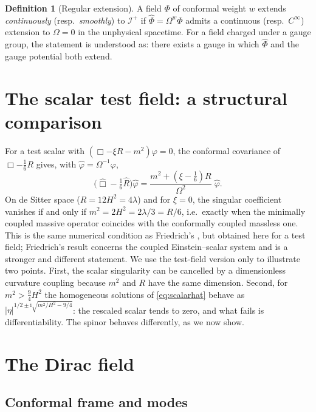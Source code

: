 \documentclass[11pt,a4paper]{article}
\theoremstyle{definition}
\newtheorem{definition}{Definition}
\newcommand{\scri}{\mathscr{I}^{+}}
\newcommand{\ii}{\mathrm{i}}
\newcommand{\hphi}{\hat\varphi}
\begin{document}
\begin{definition}[Regular extension]
A field $\Phi$ of conformal weight $w$ extends \emph{continuously} (resp.\ \emph{smoothly}) to $\scri$ if $\hat\Phi=\Omega^{w}\Phi$ admits a continuous (resp.\ $C^{\infty}$) extension to $\Omega=0$ in the unphysical spacetime. For a field charged under a gauge group, the statement is understood as: there exists a gauge in which $\hat\Phi$ and the gauge potential both extend.
\end{definition}

\section{The scalar test field: a structural comparison}
\label{sec:scalar}

For a test scalar with $(\Box-\xi R-m^{2})\varphi=0$, the conformal covariance of $\Box-\tfrac16R$ gives, with $\hphi=\Omega^{-1}\varphi$,
\begin{equation}
\Big(\hat\Box-\tfrac16\hat R\Big)\hphi=\frac{m^{2}+(\xi-\tfrac16)R}{\Omega^{2}}\;\hphi .
\label{eq:scalarhat}
\end{equation}
On de Sitter space ($R=12H^{2}=4\lambda$) and for $\xi=0$, the singular coefficient vanishes if and only if $m^{2}=2H^{2}=2\lambda/3=R/6$, i.e.\ exactly when the minimally coupled massive operator coincides with the conformally coupled massless one. This is the same numerical condition as Friedrich's \cite{Friedrich2014}, but obtained here for a test field; Friedrich's result concerns the coupled Einstein--scalar system and is a stronger and different statement. We use the test-field version only to illustrate two points. First, the scalar singularity can be cancelled by a dimensionless curvature coupling because $m^{2}$ and $R$ have the same dimension. Second, for $m^{2}>\tfrac94H^{2}$ the homogeneous solutions of \eqref{eq:scalarhat} behave as $|\eta|^{1/2\pm\ii\sqrt{m^{2}/H^{2}-9/4}}$: the rescaled scalar tends to zero, and what fails is differentiability. The spinor behaves differently, as we now show.

\section{The Dirac field}
\label{sec:dirac}

\subsection{Conformal frame and modes}
\label{sec:modes}
\end{document}
